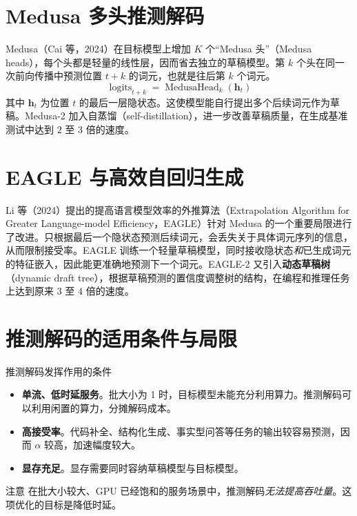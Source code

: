 \section{Medusa 多头推测解码}

Medusa（Cai 等，2024）在目标模型上增加 \(K\) 个“Medusa 头”（Medusa heads），每个头都是轻量的线性层，因而省去独立的草稿模型。第 \(k\) 个头在同一次前向传播中预测位置 \(t+k\) 的词元，也就是往后第 \(k\) 个词元。
\[
  \operatorname{logits}_{t+k}=\operatorname{MedusaHead}_k(\mathbf{h}_t)
\]
其中 \(\mathbf{h}_t\) 为位置 \(t\) 的最后一层隐状态。这使模型能自行提出多个后续词元作为草稿。Medusa-2 加入自蒸馏（self-distillation），进一步改善草稿质量，在生成基准测试中达到 \(2\) 至 \(3\) 倍的速度。

\section{EAGLE 与高效自回归生成}

Li 等（2024）提出的提高语言模型效率的外推算法（Extrapolation Algorithm for Greater Language-model Efficiency，EAGLE）针对 Medusa 的一个重要局限进行了改进。只根据最后一个隐状态预测后续词元，会丢失关于具体词元序列的信息，从而限制接受率。EAGLE 训练一个轻量草稿模型，同时接收隐状态\emph{和}已生成词元的特征嵌入，因此能更准确地预测下一个词元。EAGLE-2 又引入\textbf{动态草稿树}（dynamic draft tree），根据草稿预测的置信度调整树的结构，在编程和推理任务上达到原来 \(3\) 至 \(4\) 倍的速度。

\section{推测解码的适用条件与局限}

\begin{conceptbox}{推测解码发挥作用的条件}
\begin{itemize}
  \item \textbf{单流、低时延服务}。批大小为 1 时，目标模型未能充分利用算力。推测解码可以利用闲置的算力，分摊解码成本。
  \item \textbf{高接受率}。代码补全、结构化生成、事实型问答等任务的输出较容易预测，因而 \(\alpha\) 较高，加速幅度较大。
  \item \textbf{显存充足}。显存需要同时容纳草稿模型与目标模型。
\end{itemize}
\end{conceptbox}

\begin{notebox}{注意}
在批大小较大、GPU 已经饱和的服务场景中，推测解码\emph{无法提高吞吐量}。这项优化的目标是降低时延。
\end{notebox}

